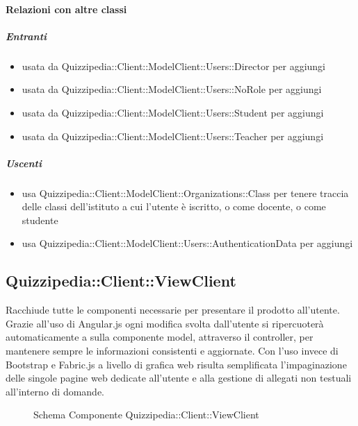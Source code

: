 \paragraph{Relazioni con altre classi}
\subparagraph{Entranti}
\begin{itemize}
\item usata da Quizzipedia::Client::ModelClient::Users::Director per aggiungi
\item usata da Quizzipedia::Client::ModelClient::Users::NoRole per aggiungi
\item usata da Quizzipedia::Client::ModelClient::Users::Student per aggiungi
\item usata da Quizzipedia::Client::ModelClient::Users::Teacher per aggiungi
\end{itemize}
\subparagraph{Uscenti}
\begin{itemize}
\item usa Quizzipedia::Client::ModelClient::Organizations::Class per tenere traccia delle classi dell'istituto a cui l'utente è iscritto, o come docente, o come studente
\item usa Quizzipedia::Client::ModelClient::Users::AuthenticationData per aggiungi
\end{itemize}
\subsection{Quizzipedia::Client::ViewClient}
Racchiude tutte le componenti necessarie per presentare il prodotto all'utente.
Grazie all'uso di Angular.js ogni modifica svolta dall'utente si ripercuoterà automaticamente a sulla componente model, attraverso il controller, per mantenere sempre le informazioni consistenti e aggiornate.
Con l'uso invece di Bootstrap e Fabric.js a livello di grafica web risulta semplificata l'impaginazione delle singole pagine web dedicate all'utente e alla gestione di allegati non testuali all'interno di domande.
\begin{figure}[H]
\centering
\noindent{}
\caption[Schema Componente Quizzipedia::Client::ViewClient]{Schema Componente Quizzipedia::Client::ViewClient}
\end{figure}
